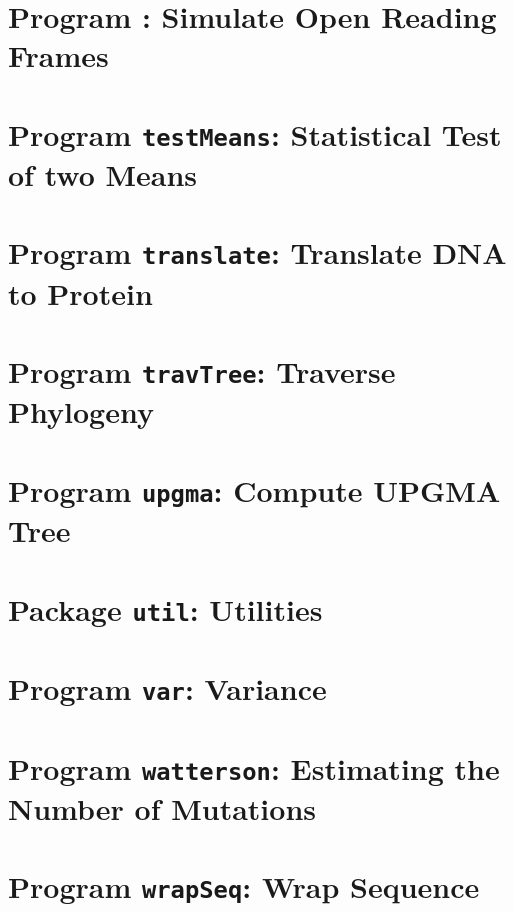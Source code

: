 \documentclass[a4paper]{report}
\begin{document}
\chapter{Program : Simulate Open Reading
  Frames}\label{ch:so}

\chapter{Program \texttt{testMeans}: Statistical Test of two Means}\label{ch:tm}

\chapter{Program \texttt{translate}: Translate DNA to
  Protein}\label{ch:tr}

\chapter{Program \texttt{travTree}: Traverse Phylogeny}\label{ch:tt}

\chapter{Program \texttt{upgma}: Compute UPGMA Tree}\label{ch:upgma}

\chapter{Package \texttt{util}: Utilities}\label{ch:uti}

\chapter{Program \texttt{var}: Variance}\label{ch:var}

\chapter{Program \texttt{watterson}: Estimating the Number of Mutations}\label{ch:wat}

\chapter{Program \texttt{wrapSeq}: Wrap Sequence}\label{ch:wra}



\end{document}
